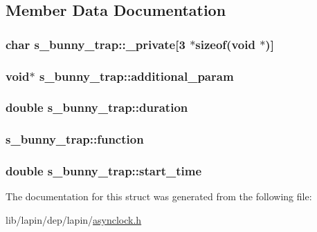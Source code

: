 \subsection{Member Data Documentation}
\hypertarget{structs__bunny__trap_a223a918d48ed1f278abf866a7e2e6341}{
\subsubsection[{\-\_\-private}]{ char s\-\_\-bunny\-\_\-trap\-::\-\_\-private\mbox{[}3 $\ast$sizeof(void $\ast$)\mbox{]}}}\label{structs__bunny__trap_a223a918d48ed1f278abf866a7e2e6341}
\hypertarget{structs__bunny__trap_a31db59a57f2d5ceddace87d922db63de}{
\subsubsection[{additional\-\_\-param}]{\setlength{\rightskip}{0pt plus 5cm}void$\ast$ s\-\_\-bunny\-\_\-trap\-::additional\-\_\-param}}\label{structs__bunny__trap_a31db59a57f2d5ceddace87d922db63de}
\hypertarget{structs__bunny__trap_af765e331f28bf266f0658a68a6db11c0}{
\subsubsection[{duration}]{ double s\-\_\-bunny\-\_\-trap\-::duration}}\label{structs__bunny__trap_af765e331f28bf266f0658a68a6db11c0}
\hypertarget{structs__bunny__trap_a64f65a9acb21bf8cc0e9286e31ef232c}{
\subsubsection[{function}]{ s\-\_\-bunny\-\_\-trap\-::function}}\label{structs__bunny__trap_a64f65a9acb21bf8cc0e9286e31ef232c}
\hypertarget{structs__bunny__trap_a390932ff9cccdaecbd59d7deeea799fc}{
\subsubsection[{start\-\_\-time}]{ double s\-\_\-bunny\-\_\-trap\-::start\-\_\-time}}\label{structs__bunny__trap_a390932ff9cccdaecbd59d7deeea799fc}


The documentation for this struct was generated from the following file\-:\begin{DoxyCompactItemize}
\item 
lib/lapin/dep/lapin/\hyperlink{asynclock_8h}{asynclock.\-h}\end{DoxyCompactItemize}
